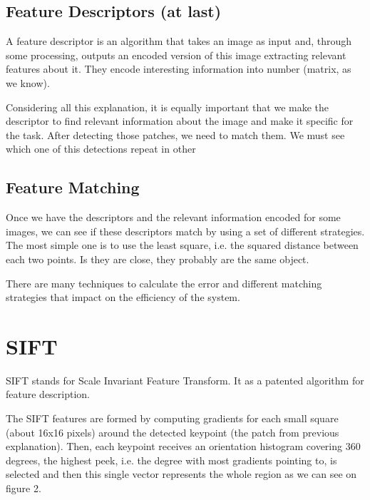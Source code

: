 \documentclass{article}
\begin{document}

\subsection{Feature Descriptors (at last)}
A feature descriptor is an algorithm that takes an image as input and, through some processing, outputs an encoded version of this image extracting relevant features about it. They encode interesting information into number (matrix, as we know).

Considering all this explanation, it is equally important that we make the descriptor to find relevant information about the image and make it specific for the task. After detecting those patches, we need to match them. We must see which one of this detections repeat in other 

\subsection{Feature Matching}
Once we have the descriptors and the relevant information encoded for some images, we can see if these descriptors match by using a set of different strategies. The most simple one is to use the least square, i.e. the squared distance between each two points. Is they are close, they probably are the same object.

There are many techniques to calculate the error and different matching strategies that impact on the efficiency of the system.



\section{SIFT}
SIFT stands for Scale Invariant Feature Transform. It as a patented algorithm for feature description. 

The SIFT features are formed by computing gradients for each small square (about 16x16 pixels) around the detected keypoint (the patch from previous explanation). Then, each keypoint receives an orientation histogram covering 360 degrees, the highest peek, i.e. the degree with most gradients pointing to, is selected and then this single vector represents the whole region as we can see on figure 2.
\end{document}
